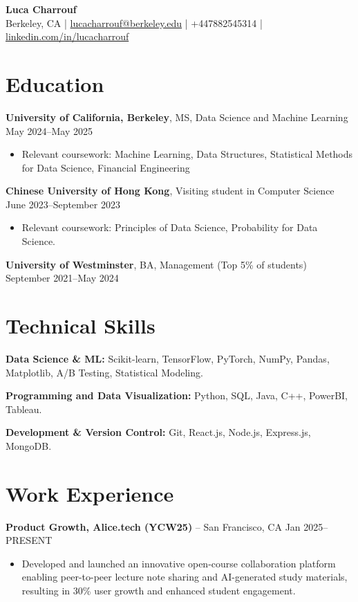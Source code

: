 \documentclass{article}
\begin{document}
\begin{center}
\textbf{\Large Luca Charrouf}\\[0.5em]
Berkeley, CA | \href{mailto:lucacharrouf@berkeley.edu}{lucacharrouf@berkeley.edu} | +447882545314 | \href{https://linkedin.com/in/lucacharrouf}{linkedin.com/in/lucacharrouf}
\end{center}

\section*{Education}
\textbf{University of California, Berkeley}, MS, Data Science and Machine Learning \hfill May 2024--May 2025
\begin{itemize}[leftmargin=*,noitemsep]
    \item Relevant coursework: Machine Learning, Data Structures, Statistical Methods for Data Science, Financial Engineering
\end{itemize}

\textbf{Chinese University of Hong Kong}, Visiting student in Computer Science \hfill June 2023--September 2023
\begin{itemize}[leftmargin=*,noitemsep]
    \item Relevant coursework: Principles of Data Science, Probability for Data Science.
\end{itemize}

\textbf{University of Westminster}, BA, Management (Top 5\% of students) \hfill September 2021--May 2024

\section*{Technical Skills}
\textbf{Data Science \& ML:} Scikit-learn, TensorFlow, PyTorch, NumPy, Pandas, Matplotlib, A/B Testing, Statistical Modeling.

\textbf{Programming and Data Visualization:} Python, SQL, Java, C++, PowerBI, Tableau.

\textbf{Development \& Version Control:} Git, React.js, Node.js, Express.js, MongoDB.

\section*{Work Experience}
\textbf{Product Growth, Alice.tech (YCW25)} -- San Francisco, CA \hfill Jan 2025--PRESENT
\begin{itemize}[leftmargin=*,noitemsep]
    \item Developed and launched an innovative open-course collaboration platform enabling peer-to-peer lecture note sharing and AI-generated study materials, resulting in 30\% user growth and enhanced student engagement.
\end{itemize}
\end{document}
